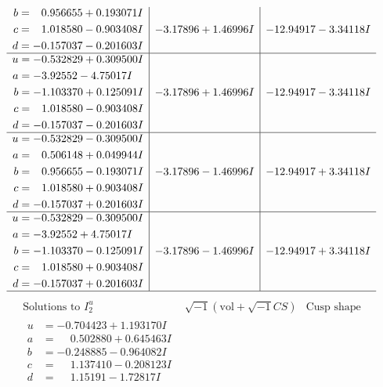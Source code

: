 \documentclass[1p]{elsarticle_modified}
\theoremstyle{definition}
\newcommand{\I}{\sqrt{-1}}
\begin{document}
$$\begin{array}{c|c|c}
\begin{aligned}
b &= \phantom{-}0.956655 + 0.193071 I \\
c &= \phantom{-}1.018580 - 0.903408 I \\
d &= -0.157037 - 0.201603 I\end{aligned}
 & -3.17896 + 1.46996 I & -12.94917 - 3.34118 I \\ \hline\begin{aligned}
u &= -0.532829 + 0.309500 I \\
a &= -3.92552 - 4.75017 I \\
b &= -1.103370 + 0.125091 I \\
c &= \phantom{-}1.018580 - 0.903408 I \\
d &= -0.157037 - 0.201603 I\end{aligned}
 & -3.17896 + 1.46996 I & -12.94917 - 3.34118 I \\ \hline\begin{aligned}
u &= -0.532829 - 0.309500 I \\
a &= \phantom{-}0.506148 + 0.049944 I \\
b &= \phantom{-}0.956655 - 0.193071 I \\
c &= \phantom{-}1.018580 + 0.903408 I \\
d &= -0.157037 + 0.201603 I\end{aligned}
 & -3.17896 - 1.46996 I & -12.94917 + 3.34118 I \\ \hline\begin{aligned}
u &= -0.532829 - 0.309500 I \\
a &= -3.92552 + 4.75017 I \\
b &= -1.103370 - 0.125091 I \\
c &= \phantom{-}1.018580 + 0.903408 I \\
d &= -0.157037 + 0.201603 I\end{aligned}
 & -3.17896 - 1.46996 I & -12.94917 + 3.34118 I\\
 \hline 
 \end{array}$$\newpage$$\begin{array}{c|c|c}  
\text{Solutions to }I^u_{2}& \I (\text{vol} + \sqrt{-1}CS) & \text{Cusp shape}\\
 \hline 
\begin{aligned}
u &= -0.704423 + 1.193170 I \\
a &= \phantom{-}0.502880 + 0.645463 I \\
b &= -0.248885 - 0.964082 I \\
c &= \phantom{-}1.137410 - 0.208123 I \\
d &= \phantom{-}1.15191 - 1.72817 I\end{aligned}

\end{array}$$
\end{document}
